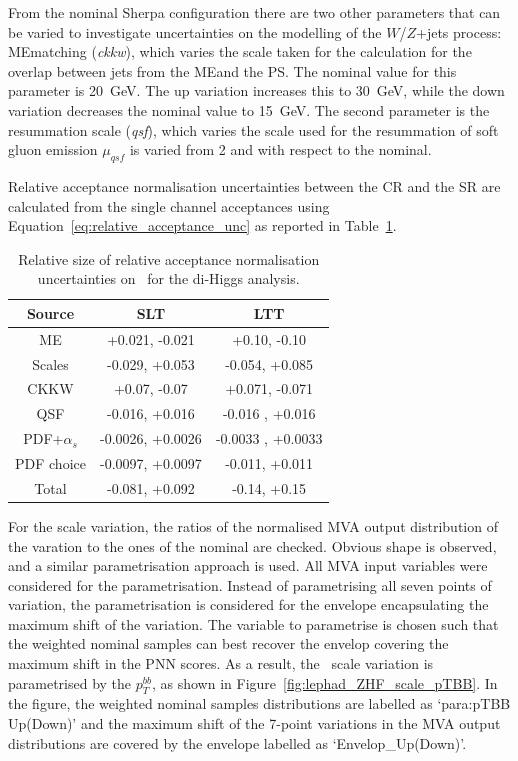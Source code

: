From the nominal Sherpa configuration there are two other parameters 
that can be varied to investigate uncertainties 
on the modelling of the $W$/$Z$+jets process: 
MEmatching (\textit{ckkw}), which varies the scale taken 
for the calculation for the overlap between jets 
from the MEand the PS. 
The nominal value for this parameter is 20~GeV. 
The up variation increases this to 30~GeV, 
while the down variation decreases the nominal value to 15~GeV. 
The second parameter is the resummation scale (\textit{qsf}), 
which varies the scale used for the resummation 
of soft gluon emission $\mu_{qsf}$ is varied from 2 and with respect to the nominal. 

Relative acceptance normalisation uncertainties between the CR and the SR are calculated 
from the single channel acceptances using Equation~\ref{eq:relative_acceptance_unc} 
as reported in Table~\ref{sec:systs:tab:systematics_normalisations_ZHF}.


\begin{table}
\centering
\small
\begin{tabular}{|c|c|c|}
\hline
Source & SLT & LTT\\
\hline
ME & +0.021, -0.021 & +0.10, -0.10 \\
Scales & -0.029, +0.053 & -0.054, +0.085 \\
CKKW & +0.07, -0.07 &  +0.071, -0.071 \\
QSF & -0.016, +0.016 & -0.016 , +0.016 \\
PDF+$\alpha_s$ & -0.0026, +0.0026 & -0.0033 , +0.0033 \\
PDF choice & -0.0097, +0.0097 & -0.011, +0.011 \\
Total & -0.081, +0.092 & -0.14, +0.15 \\
\hline
\end{tabular}
\caption{Relative size of relative acceptance normalisation uncertainties on \ZHF\ for the di-Higgs analysis.}
\label{sec:systs:tab:systematics_normalisations_ZHF}
\end{table}




For the scale variation, the ratios of the normalised MVA output distribution of the varation
to the ones of the nominal are checked. Obvious shape is observed, and
a similar parametrisation approach is used.
All MVA input variables were considered for the parametrisation. 
Instead of parametrising all seven points of variation, the parametrisation is considered
for the envelope encapsulating the maximum shift of the variation. 
The variable to parametrise is chosen such that the 
weighted nominal samples can best recover the envelop covering the maximum shift in the PNN scores. 
As a result, the \ZHF\ scale variation is parametrised by the $p_T^{bb}$,
as shown in Figure~\ref{fig:lephad_ZHF_scale_pTBB}.
In the figure, the weighted nominal samples distributions 
are labelled as `para:pTBB Up(Down)' and the maximum shift of the 7-point variations in the MVA
output distributions are covered by the envelope labelled as `Envelop\_Up(Down)'. 


